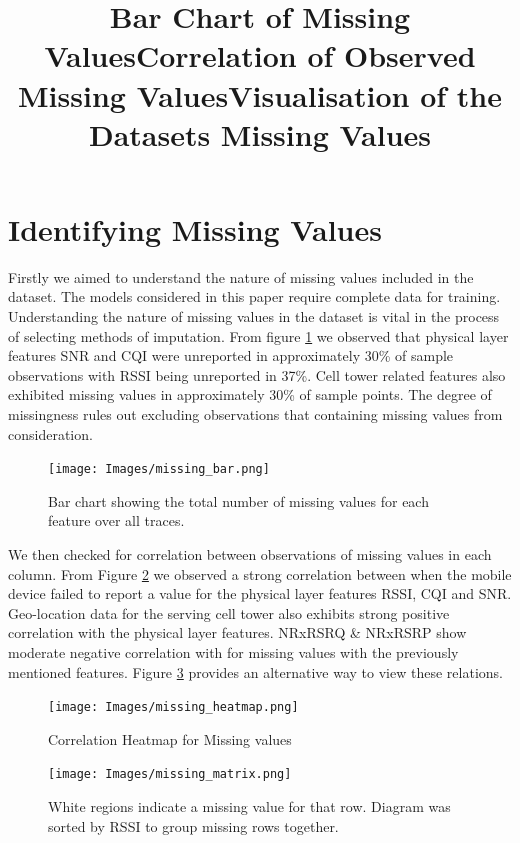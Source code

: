 \section{Identifying Missing Values}
\label{sec:missingness}
Firstly we aimed to understand the nature of missing values included in the dataset. The models considered in this paper require complete data for training. Understanding the nature of missing values in the dataset is vital in the process of selecting methods of imputation\cite{DONDERS20061087}. From figure \ref{fig:missing_bar} we observed that physical layer features SNR and CQI were unreported in approximately 30\% of sample observations with RSSI being unreported in 37\%. Cell tower related features also exhibited missing values in approximately 30\% of sample points. The degree of missingness  rules out excluding observations that containing missing values from consideration.

\begin{figure}[H]
\texttt{[image: Images/missing\_bar.png]}
\centering
\title{Bar Chart of Missing Values}
\caption{Bar chart showing the total number of missing values for each feature over all traces.}
\label{fig:missing_bar}
\end{figure}

We then checked for correlation between observations of missing values in each column. From Figure \ref{fig:missing_heatmap} we observed a strong correlation between when the mobile device failed to report a value for the physical layer features RSSI, CQI and SNR. Geo-location data for the serving cell tower also exhibits strong positive correlation with the physical layer features. NRxRSRQ \& NRxRSRP show moderate negative correlation with for missing values with the previously mentioned features. Figure \ref{fig:missing_matrix} provides an alternative way to view these relations.

\begin{figure}[H]
\texttt{[image: Images/missing\_heatmap.png]}
\centering
\title{Correlation of Observed Missing Values}
\caption{Correlation Heatmap for Missing values}
\label{fig:missing_heatmap}
\end{figure}

\begin{figure}[H]
\texttt{[image: Images/missing\_matrix.png]}
\centering
\title{Visualisation of the Datasets Missing Values}
\caption{White regions indicate a missing value for that row. Diagram was sorted by RSSI to group missing rows together.}
\label{fig:missing_matrix}
\end{figure}

